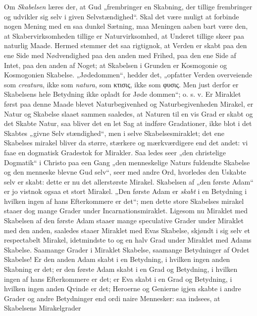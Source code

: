 \documentclass[12pt,a4paper]{article}
\newcommand{\opage}[1]{\marginnote{\footnotesize\textit{[#1]}}}
\begin{document}
Om \emph{Skabelsen} læres der, at Gud „frembringer en
Skabning, der tillige frembringer og udvikler sig selv i given
Selvstændighed“. Skal det være muligt at forbinde nogen
Mening med en saa dunkel Sætning, maa Meningen aaben\-%
bart være den, at Skabervirksomheden tillige er Naturvirksomhed,
at Underet tillige skeer paa naturlig Maade. Hermed stemmer
det saa rigtignok, at Verden er skabt paa den ene Side med
Nødvendighed paa den anden med Frihed, paa den ene Side
af Intet, paa den anden af Noget; at Skabelsen i Grunden
er Kosmogonie og Kosmogonien Skabelse. „Jødedommen“,
hedder det, „opfatter Verden overveiende som \textit{creatura}, ikke
som \textit{natura}, som κτισις, ikke som φυσις. Men just%
derfor er Skabelsens hele Betydning ikke opladt for Jøde\-%
dommen“; o. s. v. Er Miraklet først paa denne Maade blevet
\opage{7}\setcounter{footnote}{0}%
Naturbegivenhed og Naturbegivenheden Mirakel, er Natur og
Skabelse slaaet sammen saaledes, at Naturen til en vis Grad
er skabt og det Skabte Natur, saa bliver det en let Sag at
indføre Gradationer, ikke blot i det Skabtes „givne Selv\-%
stændighed“, men i selve Skabelsesmiraklet; det ene Skabelses\-%
mirakel bliver da større, stærkere og mærkværdigere end det
andet: vi faae en dogmatisk Gradestok for Mirakler. Saa\-%
ledes seer „den christelige Dogmatik“ i Christo paa een Gang
„den menneskelige Naturs fuldendte Skabelse og den menneske\-%
blevne Gud selv“, seer med andre Ord, hvorledes den Uskabte
selv er skabt: dette er nu det allerstørste Mirakel. Skabelsen
af „den første Adam“ er jo vistnok ogsaa et stort Mirakel.
„Den første Adam er \emph{skabt} i en Betydning i hvilken ingen
af hans Efterkommere er det“; men dette store Skabelses\-%
mirakel staaer dog mange Grader under Incarnationsmiraklet.
Ligesom nu Miraklet med Skabelsen af den første Adam staaer
mange speculative Grader under Miraklet med den anden,
saaledes staaer Miraklet med Evas Skabelse, skjøndt i
sig selv et respectabelt Mirakel, idetmindste to og en halv
Grad under Miraklet med Adams Skabelse. Saamange
Grader i Miraklet Skabelse, saamange Betydninger af Ordet
Skabelse! Er den anden Adam skabt i en Betydning, i
hvilken ingen anden Skabning er det; er den første Adam
skabt i en Grad og Betydning, i hvilken ingen af hans
Efterkommere er det; er Eva skabt i en Grad og Betydning,
i hvilken ingen anden Qvinde er det; Heroerne og Genierne
igjen skabte i andre Grader og andre Betydninger end ordi\-%
naire Mennesker: saa indsees, at Skabelsens Mirakelgrader
\end{document}

